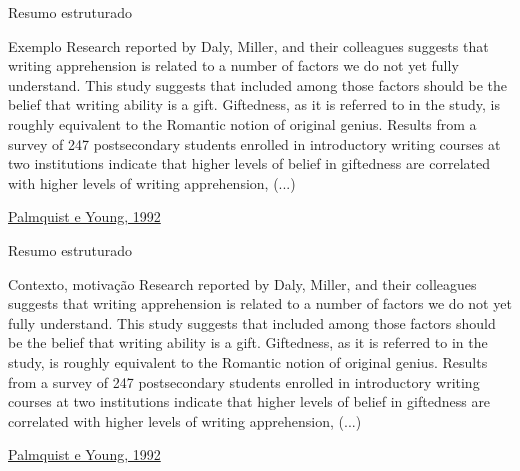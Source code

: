\documentclass{beamer}
\begin{document}
\begin{frame}{Resumo estruturado}
  \begin{exampleblock}{Exemplo}
    \scriptsize
    Research reported by Daly, Miller, and their colleagues suggests
    that writing apprehension is related to a number of factors we do
    not yet fully understand. This study suggests that included among
    those factors should be the belief that writing ability is a
    gift. Giftedness, as it is referred to in the study, is roughly
    equivalent to the Romantic notion of original genius. Results from
    a survey of 247 postsecondary students enrolled in introductory
    writing courses at two institutions indicate that higher levels of
    belief in giftedness are correlated with higher levels of writing
    apprehension, (...) 
  \end{exampleblock}

  \vfill
  \scriptsize
  \hfill \href{https://doi.org/10.1177/0741088392009001004}{Palmquist e Young, 1992}
\end{frame}

\begin{frame}{Resumo estruturado}
  \begin{exampleblock}{Contexto, motivação}
    \scriptsize
    \alert{Research reported by Daly, Miller, and their colleagues
      suggests that writing apprehension is related to a number of
      factors we do not yet fully understand. This study suggests that
      included among those factors should be the belief that writing
      ability is a gift. Giftedness, as it is referred to in the
      study, is roughly equivalent to the Romantic notion of original
      genius.} Results from a survey of 247 postsecondary students
    enrolled in introductory writing courses at two institutions
    indicate that higher levels of belief in giftedness are correlated
    with higher levels of writing apprehension, (...)
  \end{exampleblock}

  \vfill
  \scriptsize
  \hfill \href{https://doi.org/10.1177/0741088392009001004}{Palmquist e Young, 1992}
\end{frame}
\end{document}
